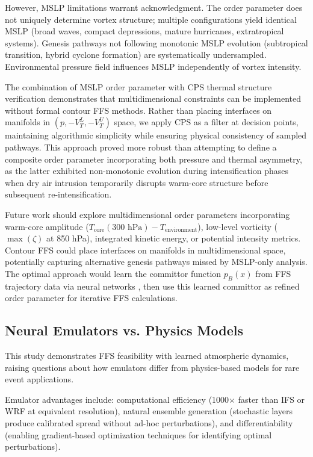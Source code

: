 \documentclass[11pt]{article}
\begin{document}
However, MSLP limitations warrant acknowledgment. The order parameter does not uniquely determine vortex structure; multiple configurations yield identical MSLP (broad waves, compact depressions, mature hurricanes, extratropical systems). Genesis pathways not following monotonic MSLP evolution (subtropical transition, hybrid cyclone formation) are systematically undersampled. Environmental pressure field influences MSLP independently of vortex intensity.

The combination of MSLP order parameter with CPS thermal structure verification demonstrates that multidimensional constraints can be implemented without formal contour FFS methods. Rather than placing interfaces on manifolds in $(p, -V_T^L, -V_T^U)$ space, we apply CPS as a filter at decision points, maintaining algorithmic simplicity while ensuring physical consistency of sampled pathways. This approach proved more robust than attempting to define a composite order parameter incorporating both pressure and thermal asymmetry, as the latter exhibited non-monotonic evolution during intensification phases when dry air intrusion temporarily disrupts warm-core structure before subsequent re-intensification.

Future work should explore multidimensional order parameters incorporating warm-core amplitude ($T_{\text{core}}(300 \text{ hPa}) - T_{\text{environment}}$), low-level vorticity ($\max(\zeta)$ at 850 hPa), integrated kinetic energy, or potential intensity metrics. Contour FFS \citep{defever2019contour} could place interfaces on manifolds in multidimensional space, potentially capturing alternative genesis pathways missed by MSLP-only analysis. The optimal approach would learn the committor function $p_B(x)$ from FFS trajectory data via neural networks \citep{rotskoff2018machine}, then use this learned committor as refined order parameter for iterative FFS calculations.

\subsection{Neural Emulators vs. Physics Models}

This study demonstrates FFS feasibility with learned atmospheric dynamics, raising questions about how emulators differ from physics-based models for rare event applications.

Emulator advantages include: computational efficiency (1000$\times$ faster than IFS or WRF at equivalent resolution), natural ensemble generation (stochastic layers produce calibrated spread without ad-hoc perturbations), and differentiability (enabling gradient-based optimization techniques for identifying optimal perturbations).
\end{document}
